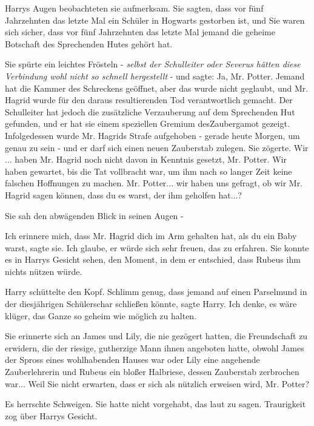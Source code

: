 Harrys Augen beobachteten sie aufmerksam. \glqq{}Sie sagten, dass vor fünf
Jahrzehnten das letzte Mal ein Schüler in Hogwarts gestorben ist, und Sie waren
sich sicher, dass vor fünf Jahrzehnten das letzte Mal jemand die geheime
Botschaft des Sprechenden Hutes gehört hat.\grqq{}

Sie spürte ein leichtes Frösteln - \emph{selbst der Schulleiter oder Severus
hätten diese Verbindung wohl nicht so schnell hergestellt} - und sagte: \glqq{}
Ja, Mr. Potter. Jemand hat die Kammer des Schreckens geöffnet, aber das wurde
nicht geglaubt, und Mr. Hagrid wurde für den daraus resultierenden Tod
verantwortlich gemacht. Der Schulleiter hat jedoch die zusätzliche Verzauberung
auf dem Sprechenden Hut gefunden, und er hat sie einem speziellen Gremium
desZaubergamot gezeigt. Infolgedessen wurde Mr. Hagrids Strafe aufgehoben -
gerade heute Morgen, um genau zu sein - und er darf sich einen neuen Zauberstab
zulegen.\grqq{} Sie zögerte. \glqq{}Wir ... haben Mr. Hagrid noch nicht davon in
Kenntnis gesetzt, Mr. Potter. Wir haben gewartet, bis die Tat vollbracht war, um
ihm nach so langer Zeit keine falschen Hoffnungen zu machen. Mr. Potter... wir
haben uns gefragt, ob wir Mr. Hagrid sagen können, dass du es warst, der ihm
geholfen hat...?\grqq{}

Sie sah den abwägenden Blick in seinen Augen -

\glqq{}Ich erinnere mich, dass Mr. Hagrid dich im Arm gehalten hat, als du ein
Baby warst\grqq{}, sagte sie. \glqq{}Ich glaube, er würde sich sehr freuen, das
zu erfahren.\grqq{} Sie konnte es in Harrys Gesicht sehen, den Moment, in dem er
entschied, dass Rubeus ihm nichts nützen würde.

Harry schüttelte den Kopf. \glqq{}Schlimm genug, dass jemand auf einen Parselmund
in der diesjährigen Schülerschar schließen könnte\grqq{}, sagte Harry. \glqq{}Ich
denke, es wäre klüger, das Ganze so geheim wie möglich zu halten.\grqq{}

Sie erinnerte sich an James und Lily, die nie gezögert hatten, die Freundschaft
zu erwidern, die der riesige, gutherzige Mann ihnen angeboten hatte, obwohl
James der Spross eines wohlhabenden Hauses war oder Lily eine angehende
Zauberlehrerin und Rubeus ein bloßer Halbriese, dessen Zauberstab zerbrochen
war... \glqq{}Weil Sie nicht erwarten, dass er sich als nützlich erweisen wird,
Mr. Potter?\grqq{}

Es herrschte Schweigen. Sie hatte nicht vorgehabt, das laut zu sagen.
Traurigkeit zog über Harrys Gesicht.

